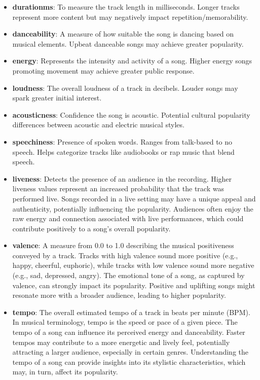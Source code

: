 \documentclass[
]{article}
\begin{document}
\begin{itemize}
\item
  \textbf{durationms}: To measure the track length in milliseconds.
  Longer tracks represent more content but may negatively impact
  repetition/memorability.
\item
  \textbf{danceability}: A measure of how suitable the song is dancing
  based on musical elements. Upbeat danceable songs may achieve greater
  popularity.
\item
  \textbf{energy}: Represents the intensity and activity of a song.
  Higher energy songs promoting movement may achieve greater public
  response.
\item
  \textbf{loudness}: The overall loudness of a track in decibels. Louder
  songs may spark greater initial interest.
\item
  \textbf{acousticness}: Confidence the song is acoustic. Potential
  cultural popularity differences between acoustic and electric musical
  styles.
\item
  \textbf{speechiness}: Presence of spoken words. Ranges from talk-based
  to no speech. Helps categorize tracks like audiobooks or rap music
  that blend speech.
\item
  \textbf{liveness}: Detects the presence of an audience in the
  recording. Higher liveness values represent an increased probability
  that the track was performed live. Songs recorded in a live setting
  may have a unique appeal and authenticity, potentially influencing the
  popularity. Audiences often enjoy the raw energy and connection
  associated with live performances, which could contribute positively
  to a song's overall popularity.
\item
  \textbf{valence}: A measure from 0.0 to 1.0 describing the musical
  positiveness conveyed by a track. Tracks with high valence sound more
  positive (e.g., happy, cheerful, euphoric), while tracks with low
  valence sound more negative (e.g., sad, depressed, angry). The
  emotional tone of a song, as captured by valence, can strongly impact
  its popularity. Positive and uplifting songs might resonate more with
  a broader audience, leading to higher popularity.
\item
  \textbf{tempo}: The overall estimated tempo of a track in beats per
  minute (BPM). In musical terminology, tempo is the speed or pace of a
  given piece. The tempo of a song can influence its perceived energy
  and danceability. Faster tempos may contribute to a more energetic and
  lively feel, potentially attracting a larger audience, especially in
  certain genres. Understanding the tempo of a song can provide insights
  into its stylistic characteristics, which may, in turn, affect its
  popularity.
\end{itemize}
\end{document}
